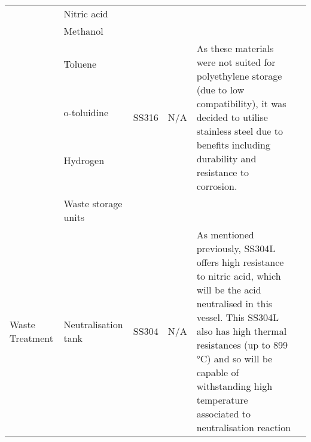 \begin{table}[H]
\begin{tabular}{@{}p{3cm}|p{3cm}|p{3cm}|p{3cm}|p{3cm}l@{}}
                                                      & Nitric acid                         &                                                                                               &                                                    &            \\
                                                      & Methanol                            &                                                 &                              & \\
                                                      & Toluene                                                  &    \multirow{4}{*}{SS316} & \multirow{4}{*}{N/A}                                                       &  \multirow{4}{*}{As these materials were not suited for polyethylene storage (due to low compatibility), it was decided to utilise stainless steel due to benefits including durability and resistance to corrosion.}                                         \\
                                                      & o-toluidine                                              &                                                                                               &                                                    &      \\
                                                      & Hydrogen                                                 &                                                                                               &                                                    &    \\
                                                      &                                                          &                                                                                               &                                                    &                                           \\ 
     & {Waste storage units}                    &                                                                   &                            &                                                                                                                                                         \\ \midrule
    \multirow{3}{*}{Waste Treatment}           & Neutralisation tank                 & SS304              & N/A                                                & As   mentioned previously, SS304L offers high resistance to nitric acid, which   will be the acid neutralised in this vessel. This SS304L also has high   thermal resistances (up to 899 °C) and so will be capable of withstanding high   temperature associated to neutralisation reaction                                                                \\

\end{tabular}
\end{table}
